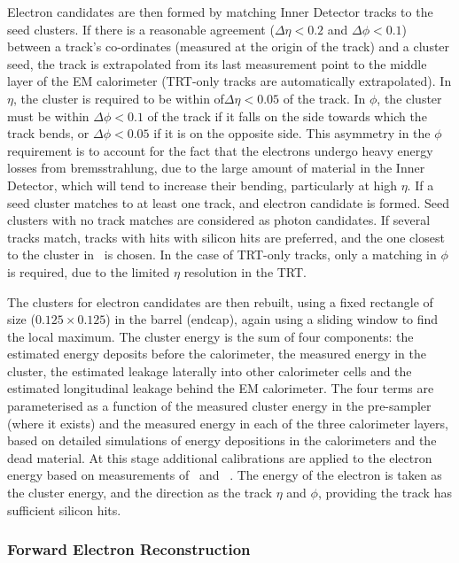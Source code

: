Electron candidates are then formed by matching Inner Detector tracks to the
seed clusters. If there is a reasonable agreement ($\Delta \eta <0.2$ and
$\Delta \phi <0.1$) between a track's co-ordinates (measured at the origin of the
track) and a cluster seed, the track is extrapolated from its last measurement point to
the middle layer of the EM calorimeter (TRT-only tracks are automatically
extrapolated). In $\eta$, the cluster is required to be within 
of$\Delta \eta <0.05$ of the track. In $\phi$, the cluster must be within $\Delta \phi < 0.1$ of
the track if it falls on the side towards which the track bends, or $\Delta
\phi < 0.05$ if it is on the opposite side. This asymmetry in the $\phi$
requirement is to
account for the fact that the electrons undergo heavy energy losses from
bremsstrahlung, due to the large amount of material in the Inner Detector, which
will tend to increase their bending,
particularly at high $\eta$. If a seed cluster matches to at least one track,
and electron candidate is formed. Seed clusters with no track matches are
considered as photon candidates. If several tracks match, tracks with hits with
silicon hits are preferred, and the one closest to the cluster in \deltaR\ 
is chosen. In the case of TRT-only tracks, only a matching in $\phi$ is required, 
due to the limited $\eta$ resolution in the TRT.

The clusters for electron candidates are then rebuilt, using a fixed rectangle of size 
\deltaetadeltaphi{0.075}{0.175} ($0.125 \times 0.125$) in the barrel (endcap),
again using a sliding window to find the local maximum. The cluster energy is
the sum of four components: the estimated energy deposits before the
calorimeter, the measured energy in the cluster, the estimated leakage laterally
into other calorimeter cells and the estimated longitudinal leakage behind the
EM calorimeter. The four terms are parameterised as a function of the measured
cluster energy in the pre-sampler (where it exists) and the measured energy in each of the three
calorimeter layers, based on detailed simulations of energy depositions in the
calorimeters and the dead material. At this stage additional calibrations are
applied to the electron energy based on measurements of \Zee\ and
\JPsiee~\cite{Aad:2011mk}. The energy of the electron is taken as the cluster
energy, and the direction as the track $\eta$ and $\phi$, providing the track
has sufficient silicon hits.

\subsubsection{Forward Electron Reconstruction}

